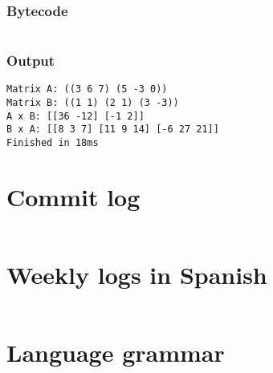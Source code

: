 \documentclass[11pt]{scrreprt}
\begin{document}
\subsection{Bytecode}
\inputminted{text}{/home/mario/git/MarioJim/miniclj/examples/matrix_multiplication.mclj}

\subsection{Output}
\begin{verbatim}
Matrix A: ((3 6 7) (5 -3 0))
Matrix B: ((1 1) (2 1) (3 -3))
A x B: [[36 -12] [-1 2]]
B x A: [[8 3 7] [11 9 14] [-6 27 21]]
Finished in 18ms
\end{verbatim}


\appendix

\chapter{Commit log}
\label{apdx:commits}
\inputminted{text}{/home/mario/git/MarioJim/miniclj/docs/commits.txt}

\chapter{Weekly logs in Spanish}
\label{apdx:weeklylogs}
\inputminted[breaklines=true]{md}{/home/mario/git/MarioJim/miniclj/docs/logs.md}

\chapter{Language grammar}
\label{apdx:grammar}
\inputminted{rust}{/home/mario/git/MarioJim/miniclj/miniclj-lib/src/lispparser.lalrpop}
\end{document}
